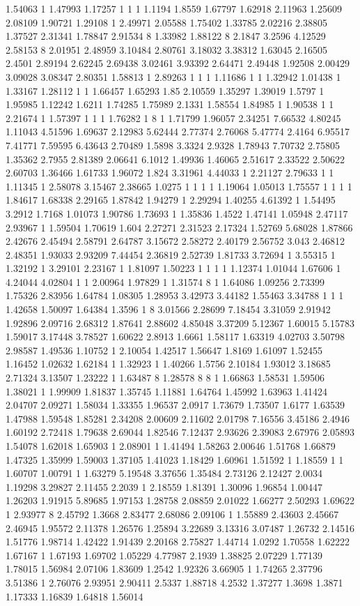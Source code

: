 1.54063 1 1.47993 1.17257 1 1 1 1.1194 1.8559 1.67797 1.62918 2.11963 1.25609 2.08109 1.90721 1.29108 1 2.49971 2.05588 1.75402 1.33785 2.02216 2.38805 1.37527 2.31341 1.78847 2.91534 8 1.33982 1.88122 8 2.1847 3.2596 4.12529 2.58153 8 2.01951 2.48959 3.10484 2.80761 3.18032 3.38312 1.63045 2.16505 2.4501 2.89194 2.62245 2.69438 3.02461 3.93392 2.64471 2.49448 1.92508 2.00429 3.09028 3.08347 2.80351 1.58813 1 2.89263 1 1 1 1.11686 1 1 1.32942 1.01438 1 1.33167 1.28112 1 1 1.66457 1.65293 1.85 2.10559 1.35297 1.39019 1.5797 1 1.95985 1.12242 1.6211 1.74285 1.75989 2.1331 1.58554 1.84985 1 1.90538 1 1 2.21674 1 1.57397 1 1 1 1.76282 1 8 1 1.71799 1.96057 2.34251 7.66532 4.80245 1.11043 4.51596 1.69637 2.12983 5.62444 2.77374 2.76068 5.47774 2.4164 6.95517 7.41771 7.59595 6.43643 2.70489 1.5898 3.3324 2.9328 1.78943 7.70732 2.75805 1.35362 2.7955 2.81389 2.06641 6.1012 1.49936 1.46065 2.51617 2.33522 2.50622 2.60703 1.36466 1.61733 1.96072 1.824 3.31961 4.44033 1 2.21127 2.79633 1 1 1.11345 1 2.58078 3.15467 2.38665 1.0275 1 1 1 1 1.19064 1.05013 1.75557 1 1 1 1 1.84617 1.68338 2.29165 1.87842 1.94279 1 2.29294 1.40255 4.61392 1 1.54495 3.2912 1.7168 1.01073 1.90786 1.73693 1 1.35836 1.4522 1.47141 1.05948 2.47117 2.93967 1 1.59504 1.70619 1.604 2.27271 2.31523 2.17324 1.52769 5.68028 1.87866 2.42676 2.45494 2.58791 2.64787 3.15672 2.58272 2.40179 2.56752 3.043 2.46812 2.48351 1.93033 2.93209 7.44454 2.36819 2.52739 1.81733 3.72694 1 3.55315 1 1.32192 1 3.29101 2.23167 1 1.81097 1.50223 1 1 1 1 1.12374 1.01044 1.67606 1 4.24044 4.02804 1 1 2.00964 1.97829 1 1.31574 8 1 1.64086 1.09256 2.73399 1.75326 2.83956 1.64784 1.08305 1.28953 3.42973 3.44182 1.55463 3.34788 1 1 1 1.42658 1.50097 1.64384 1.3596 1 8 3.01566 2.28699 7.18454 3.31059 2.91942 1.92896 2.09716 2.68312 1.87641 2.88602 4.85048 3.37209 5.12367 1.60015 5.15783 1.59017 3.17448 3.78527 1.60622 2.8913 1.6661 1.58117 1.63319 4.02703 3.50798 2.98587 1.49536 1.10752 1 2.10054 1.42517 1.56647 1.8169 1.61097 1.52455 1.16452 1.02632 1.62184 1 1.32923 1 1.40266 1.5756 2.10184 1.93012 3.18685 2.71324 3.13507 1.23222 1 1.63487 8 1.28578 8 8 1 1.66863 1.58531 1.59506 1.38021 1 1.99909 1.81837 1.35745 1.11881 1.64764 1.45992 1.63963 1.41424 2.04707 2.09271 1.58034 1.33355 1.96537 2.0917 1.73679 1.73507 1.6177 1.63539 1.47988 1.59548 1.85281 2.34208 2.00609 2.11602 2.01798 7.16556 3.45186 2.4946 1.60192 2.72418 1.79638 2.69044 1.82546 7.12437 2.93626 2.39083 2.67976 2.05893 1.54078 1.62018 1.65903 1 2.08901 1 1.41494 1.58263 2.00646 1.51768 1.66879 1.47325 1.35999 1.59003 1.37105 1.41023 1.18429 1.60961 1.51592 1 1.18559 1 1 1.60707 1.00791 1 1.63279 5.19548 3.37656 1.35484 2.73126 2.12427 2.0034 1.19298 3.29827 2.11455 2.2039 1 2.18559 1.81391 1.30096 1.96854 1.00447 1.26203 1.91915 5.89685 1.97153 1.28758 2.08859 2.01022 1.66277 2.50293 1.69622 1 2.93977 8 2.45792 1.3668 2.83477 2.68086 2.09106 1 1.55889 2.43603 2.45667 2.46945 1.95572 2.11378 1.26576 1.25894 3.22689 3.13316 3.07487 1.26732 2.14516 1.51776 1.98714 1.42422 1.91439 2.20168 2.75827 1.44714 1.0292 1.70558 1.62222 1.67167 1 1.67193 1.69702 1.05229 4.77987 2.1939 1.38825 2.07229 1.77139 1.78015 1.56984 2.07106 1.83609 1.2542 1.92326 3.66905 1 1.74265 2.37796 3.51386 1 2.76076 2.93951 2.90411 2.5337 1.88718 4.2532 1.37277 1.3698 1.3871 1.17333 1.16839 1.64818 1.56014 